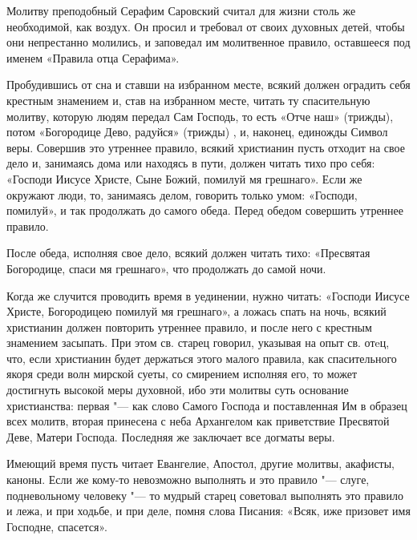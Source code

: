 \begin{mymulticols}

Молитву преподобный Серафим Саровский считал для жизни столь же необходимой, как  воздух. Он просил и требовал от своих духовных детей, чтобы они непрестанно молились, и заповедал им молитвенное правило, оставшееся под именем «Правила отца Серафима». 

Пробудившись от сна и ставши на избранном месте, всякий должен оградить себя крестным знамением и, став на избранном месте, читать ту спасительную молитву, которую людям передал Сам Господь, то есть «Отче наш» (трижды), потом «Богородице Дево, радуйся» (трижды) , и, наконец, единожды Символ веры. Совершив это утреннее правило, всякий христианин пусть отходит на свое дело и, занимаясь дома или находясь в пути, должен читать тихо про себя: «Господи Иисусе Христе, Сыне Божий, помилуй мя грешнаго». Если же окружают люди, то, занимаясь делом, говорить только умом: «Господи, помилуй», и так продолжать до самого обеда. Перед обедом совершить утреннее правило. 

После обеда, исполняя свое дело, всякий должен читать тихо: «Пресвятая Богородице, спаси мя грешнаго», что продолжать до самой ночи. 

Когда же случится проводить время в уединении, нужно читать: «Господи Иисусе Христе, Богородицею помилуй мя грешнаго», а ложась спать на ночь, всякий христианин должен повторить утреннее правило, и после него с крестным знамением засыпать. При этом св. старец говорил, указывая на опыт св. отeц, что, если христианин будет держаться этого малого правила, как спасительного якоря среди волн мирской суеты, со смирением исполняя его, то может достигнуть высокой меры духовной, ибо эти молитвы суть  основание христианства: первая "--- как слово Самого Господа и поставленная Им в образец всех молитв, вторая принесена с неба Архангелом как приветствие Пресвятой Деве, Матери Господа. Последняя же заключает все догматы веры. 

Имеющий время пусть читает Евангелие, Апостол, другие молитвы, акафисты, каноны. Если же кому-то невозможно выполнять и это правило "--- слуге, подневольному человеку "--- то мудрый старец советовал выполнять это правило и лежа, и при ходьбе, и при деле, помня слова Писания: «Всяк, иже призовет имя Господне, спасется». 

\end{mymulticols}


\mychapterending

 
